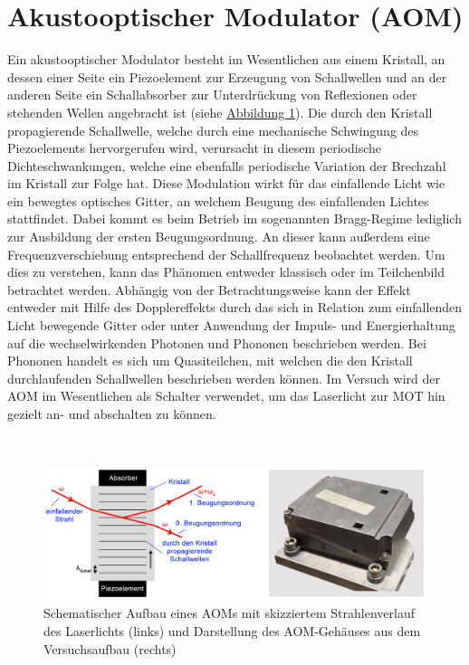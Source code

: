 \documentclass[
class=book,
accentcolor=1b,
custommargins=geometry,
fontsize=11pt,
thesis={type=Versuchsanleitung},
ruledheaders=all,
headline=false,
instbox=false,
marginpar=false,
title=small,
ignore-missing-data=true,
twoside=false,
logofile=apqdesign/tuda_logo.pdf,
pdfa=false %
]{apqpub}
\newtheorem{frage}[satz]{Frage}
\newcommand{\gqq}[1]{\glqq{}#1\grqq{}}
\begin{document}
\section{Akustooptischer Modulator (AOM)}

Ein akustooptischer Modulator besteht im Wesentlichen aus einem Kristall, an dessen einer Seite ein Piezoelement zur Erzeugung von Schallwellen und an der anderen Seite ein Schallabsorber zur Unterdrückung von Reflexionen oder stehenden Wellen angebracht ist (siehe \hyperref[fig:AOM]{Abbildung \ref{fig:AOM}}).
Die durch den Kristall propagierende Schallwelle, welche durch eine mechanische Schwingung des Piezoelements hervorgerufen wird, verursacht in diesem periodische Dichteschwankungen, welche eine ebenfalls periodische Variation der Brechzahl im Kristall zur Folge hat.\cite{OLL}
Diese Modulation wirkt für das einfallende Licht wie ein bewegtes optisches Gitter, an welchem Beugung des einfallenden Lichtes stattfindet. 
Dabei kommt es beim Betrieb im sogenannten Bragg-Regime lediglich zur Ausbildung der ersten Beugungsordnung. An dieser kann außerdem eine Frequenzverschiebung entsprechend der Schallfrequenz beobachtet werden. 
Um dies zu verstehen, kann das Phänomen entweder klassisch oder im Teilchenbild betrachtet werden. 
Abhängig von der Betrachtungsweise kann der Effekt entweder mit Hilfe des Dopplereffekts durch das sich in Relation zum einfallenden Licht \gqq{bewegende Gitter} oder unter Anwendung der Impuls- und Energierhaltung auf die wechselwirkenden Photonen und Phononen beschrieben werden.
Bei Phononen handelt es sich um Quasiteilchen, mit welchen die den Kristall durchlaufenden Schallwellen beschrieben werden können. \cite{OFI}
Im Versuch wird der AOM im Wesentlichen als Schalter verwendet, um das Laserlicht zur MOT hin gezielt an- und abschalten zu können.
\vspace{7pt}

\\	
	\begin{figure}[htb!]
		\centering
		\includegraphics[width=\textwidth]{graphics/AOM2.pdf}
		\caption{Schematischer Aufbau eines AOMs mit skizziertem Strahlenverlauf des Laserlichts (links)
			und Darstellung des AOM-Gehäuses aus dem Versuchsaufbau (rechts)}
		\label{fig:AOM}
	\end{figure}
	
\end{document}
